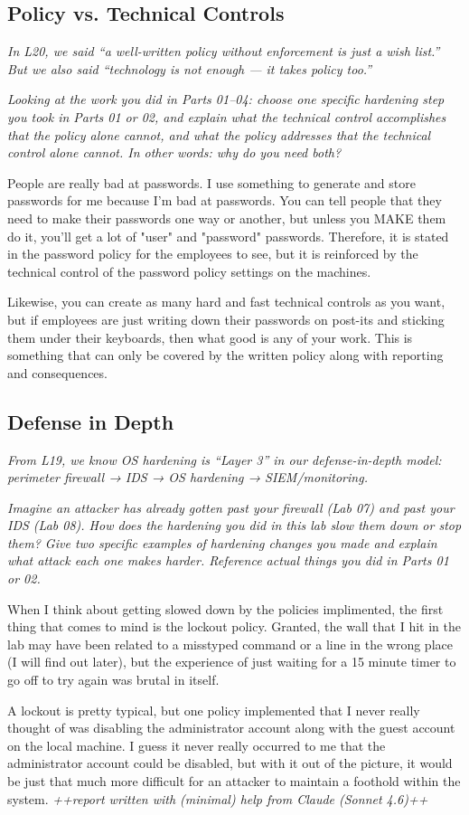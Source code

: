 \documentclass[12pt]{article}
\begin{document}
\subsection{Policy vs. Technical Controls}
\textit{In L20, we said “a well-written policy without enforcement is just a wish list.” But we also said “technology is not enough — it takes policy too.”} \par \textit{Looking at the work you did in Parts 01–04: choose one specific hardening step you took in Parts 01 or 02, and explain what the technical control accomplishes that the policy alone cannot, and what the policy addresses that the technical control alone cannot. In other words: why do you need both?}\\
\par People are really bad at passwords. I use something to generate and store passwords for me because I'm bad at passwords. You can tell people that they need to make their passwords one way or another, but unless you MAKE them do it, you'll get a lot of "user" and "password" passwords. Therefore, it is stated in the password policy for the employees to see, but it is reinforced by the technical control of the password policy settings on the machines.
\par Likewise, you can create as many hard and fast technical controls as you want, but if employees are just writing down their passwords on post-its and sticking them under their keyboards, then what good is any of your work. This is something that can only be covered by the written policy along with reporting and consequences.

\newpage
\subsection{Defense in Depth}
\textit{From L19, we know OS hardening is “Layer 3” in our defense-in-depth model: perimeter firewall → IDS → OS hardening → SIEM/monitoring.} \par \textit{Imagine an attacker has already gotten past your firewall (Lab 07) and past your IDS (Lab 08). How does the hardening you did in this lab slow them down or stop them? Give two specific examples of hardening changes you made and explain what attack each one makes harder. Reference actual things you did in Parts 01 or 02.}\\
\par When I think about getting slowed down by the policies implimented, the first thing that comes to mind is the lockout policy. Granted, the wall that I hit in the lab may have been related to a misstyped command or a line in the wrong place (I will find out later), but the experience of just waiting for a 15 minute timer to go off to try again was brutal in itself.
\par A lockout is pretty typical, but one policy implemented that I never really thought of was disabling the administrator account along with the guest account on the local machine. I guess it never really occurred to me that the administrator account could be disabled, but with it out of the picture, it would be just that much more difficult for an attacker to maintain a foothold within the system. 
\vfill
\textit{++report written with (minimal) help from Claude (Sonnet 4.6)++}
\end{document}
